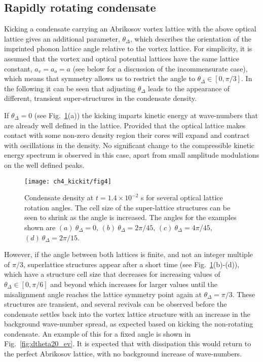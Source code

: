 \subsection{Rapidly rotating condensate}

    Kicking a condensate carrying an Abrikosov vortex lattice with the above optical lattice gives an additional parameter, $\theta_\Delta$, which describes the orientation of the imprinted phonon lattice angle relative to the vortex lattice. For simplicity, it is assumed that the vortex and optical potential lattices have the same lattice constant, $a_v=a_o=a$ (see below for a discussion of the incommensurate case), which means that symmetry allows us to restrict the angle to $\theta_\Delta\in[0,\pi/3]$. In the following it can be seen that adjusting $\theta_\Delta$ leads to the appearance of different, transient super-structures in the condensate density.

    If $\theta_\Delta=0$ (see Fig.~\ref{fig:moire_density}(a)) the kicking imparts kinetic energy at wave-numbers that are already well defined in the lattice. Provided that the optical lattice makes contact with some non-zero density region their cores will expand and contract with oscillations in the density. No significant change to the compressible kinetic energy spectrum is observed in this case, apart from small amplitude modulations on the well defined peaks.

	\begin{figure}[tb]
        \centering
			\texttt{[image: ch4\_kickit/fig4]}
			\caption[Effect of kicking on condensate with a large vortex lattice.]{Condensate density at $t=1.4\times10^{-2}$ s for several optical lattice rotation angles. The cell size of the super-lattice structures can be seen to shrink as the angle is increased. The angles for the examples shown are $(a)~\theta_\Delta=0$, $(b)~\theta_\Delta=2\pi/45$, $(c)~\theta_\Delta=4\pi/45$, $(d)~\theta_\Delta=2\pi/15$. }
			\label{fig:moire_density}
		\end{figure}

    However, if the angle between both lattices is finite, and not an integer multiple of $\pi/3$, superlattice structures appear after a short time (see Fig.~\ref{fig:moire_density}(b)-(d)), which have a structure cell size that decreases for increasing values of $\theta_\Delta\in[0,\pi/6]$ and beyond which increases for larger values until the misalignment angle reaches the lattice symmetry point again at $\theta_\Delta=\pi/3$. These structures are transient, and several revivals can be observed before the condensate settles back into the vortex lattice structure with an increase in the background wave-number spread, as expected based on kicking the non-rotating condensate. An example of this for a fixed angle is shown in Fig.~\ref{fig:dtheta20_ev}. It is expected that with dissipation this would return to the perfect Abrikosov lattice, with no background increase of wave-numbers.

